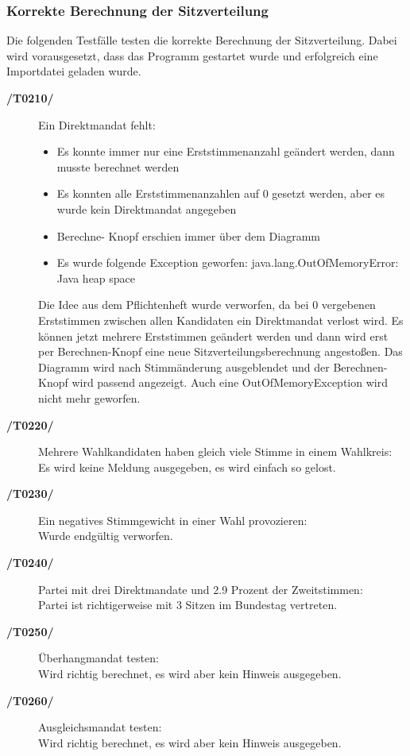 \documentclass[12pt,a4paper,titlepage]{article}
\begin{document}
\subsubsection{Korrekte Berechnung der Sitzverteilung}
Die folgenden Testfälle testen die korrekte Berechnung der Sitzverteilung. Dabei wird vorausgesetzt, dass  das Programm gestartet wurde und erfolgreich eine Importdatei geladen wurde.
\begin{description}
	\item[\textbf{/T0210/}] Ein Direktmandat fehlt: \\
	\begin{itemize}
	\item Es konnte immer nur eine Erststimmenanzahl geändert werden, dann musste berechnet werden
	\item Es konnten alle Erststimmenanzahlen auf 0 gesetzt werden, aber es wurde kein Direktmandat angegeben
	\item Berechne- Knopf erschien immer über dem Diagramm
	\item Es wurde folgende Exception geworfen: java.lang.OutOfMemoryError: Java heap space
	\end{itemize}
	
	Die Idee aus dem Pflichtenheft wurde verworfen, da bei 0 vergebenen Erststimmen zwischen allen Kandidaten ein Direktmandat verlost wird.
	Es können jetzt mehrere Erststimmen geändert werden und dann wird erst per Berechnen-Knopf eine neue Sitzverteilungsberechnung angestoßen.
	Das Diagramm wird nach Stimmänderung ausgeblendet und der Berechnen-Knopf wird passend angezeigt.
	Auch eine OutOfMemoryException wird nicht mehr geworfen.
	\item[\textbf{/T0220/}] Mehrere Wahlkandidaten haben gleich viele Stimme in einem Wahlkreis: \\
	Es wird keine Meldung ausgegeben, es wird einfach so gelost.
	\item[\textbf{/T0230/}] Ein negatives Stimmgewicht in einer Wahl provozieren: \\
	Wurde endgültig verworfen.
	\item[\textbf{/T0240/}] Partei mit drei Direktmandate und 2.9 Prozent der Zweitstimmen: \\
	Partei ist richtigerweise mit 3 Sitzen im Bundestag vertreten.
	
	\item[\textbf{/T0250/}] Überhangmandat testen: \\

Wird richtig berechnet, es wird aber kein Hinweis ausgegeben.

	\item[\textbf{/T0260/}] Ausgleichsmandat testen: \\

Wird richtig berechnet, es wird aber kein Hinweis ausgegeben.
	


\end{description}
\end{document}
